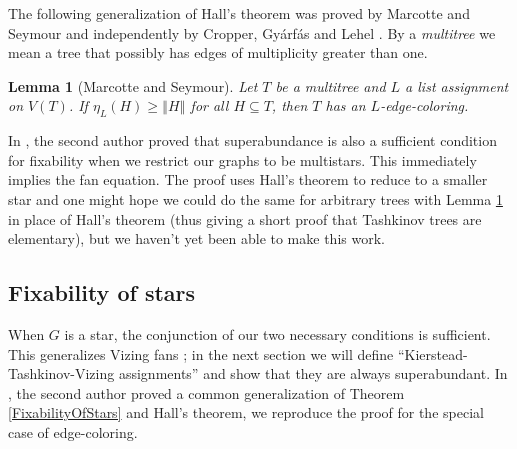 \documentclass[12pt]{article}
\theoremstyle{plain}
\newtheorem{lem}[thm]{Lemma}
\theoremstyle{definition}
\theoremstyle{remark}
\newcommand{\size}[1]{\left\Vert#1\right\Vert}
\begin{document}
The following generalization of Hall's theorem was proved by Marcotte and Seymour \cite{marcotte1990extending} and independently by Cropper, Gy{\'a}rf{\'a}s and Lehel \cite{cropper2003edge}.  By a \emph{multitree} we mean a tree that possibly has edges of multiplicity greater than one.

\begin{lem}[Marcotte and Seymour]\label{MultiTreeHall}
Let $T$ be a multitree and $L$ a list assignment on $V(T)$.  If $\eta_L(H) \ge \size{H}$ for all $H \subseteq T$, then $T$ has an $L$-edge-coloring.
\end{lem}

In \cite{HallGame}, the second author proved that superabundance is also a sufficient condition for fixability when we restrict our graphs to be multistars.  This immediately implies the fan equation.  The proof uses Hall's theorem to reduce to a smaller star and one might hope we could do the same for arbitrary trees with Lemma \ref{MultiTreeHall} in place of Hall's theorem (thus giving a short proof that Tashkinov trees are elementary), but we haven't yet been able to make this work.

\subsection{Fixability of stars}
When $G$ is a star, the conjunction of our two necessary conditions is sufficient. This generalizes Vizing fans \cite{Vizing76}; in the next section we will define ``Kierstead-Tashkinov-Vizing assignments'' and show that they are always superabundant.  In \cite{HallGame}, the second author proved a common generalization of Theorem \ref{FixabilityOfStars} and Hall's theorem, we reproduce the proof for the special case of edge-coloring.
\end{document}
